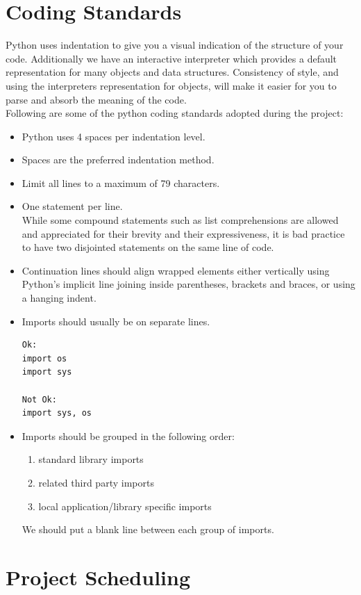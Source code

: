 \section{Coding Standards}
Python uses indentation to give you a visual indication of the structure of your code. Additionally we have an interactive interpreter which provides a default representation for many objects and data structures. Consistency of style, and using the interpreters representation for objects, will make it easier for you to parse and absorb the meaning of the code.\\
Following are some of the python coding standards adopted during the project:
\begin{itemize}
	\item Python uses 4 spaces per indentation level.
	\item Spaces are the preferred indentation method.
	\item Limit all lines to a maximum of 79 characters.
	\item One statement per line.\\
	While some compound statements such as list comprehensions are allowed and appreciated for their brevity and their expressiveness, it is bad practice to have two disjointed statements on the same line of code.
	\item Continuation lines should align wrapped elements either vertically using Python's implicit line joining inside parentheses, brackets and braces, or using a hanging indent.
	\item Imports should usually be on separate lines.
	\begin{lstlisting}
Ok:
import os
import sys

Not Ok:
import sys, os
	\end{lstlisting}
	\item Imports should be grouped in the following order:
	
	\begin{enumerate}
		\item standard library imports
		\item related third party imports
		\item local application/library specific imports
	\end{enumerate}
	We should put a blank line between each group of imports.
\end{itemize}

\section{Project Scheduling}

